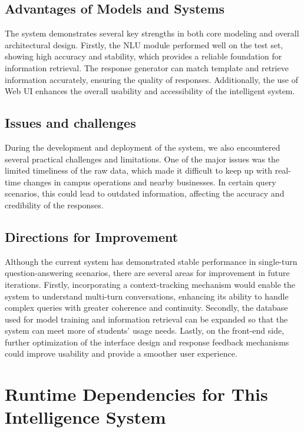 \documentclass{xum_review}
\begin{document}
	\subsection{Advantages of Models and Systems}

	The system demonstrates several key strengths in both core modeling and
	overall architectural design. Firstly, the NLU module performed well on the
	test set, showing high accuracy and stability, which provides a reliable
	foundation for information retrieval. The response generator can match
	template and retrieve information accurately, ensuring the quality of
	responses. Additionally, the use of Web UI enhances the overall usability
	and accessibility of the intelligent system.

	\subsection{Issues and challenges}

	During the development and deployment of the system, we also encountered
	several practical challenges and limitations. One of the major issues was
	the limited timeliness of the raw data, which made it difficult to keep up
	with real-time changes in campus operations and nearby businesses. In
	certain query scenarios, this could lead to outdated information, affecting
	the accuracy and credibility of the responses.

	\subsection{Directions for Improvement}

	Although the current system has demonstrated stable performance in
	single-turn question-answering scenarios, there are several areas for
	improvement in future iterations. Firstly, incorporating a context-tracking
	mechanism would enable the system to understand multi-turn conversations,
	enhancing its ability to handle complex queries with greater coherence and
	continuity. Secondly, the database used for model training and information
	retrieval can be expanded so that the system can meet more of students'
	usage needs. Lastly, on the front-end side, further optimization of the
	interface design and response feedback mechanisms could improve usability
	and provide a smoother user experience.



\appendix
\section{Runtime Dependencies for This Intelligence System}
\label{sec:appendix}
\end{document}
